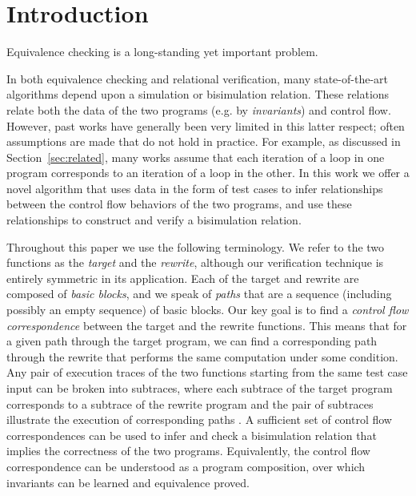 \section{Introduction}

Equivalence checking is a long-standing yet important problem.

In both equivalence checking and relational verification, many
state-of-the-art algorithms depend upon a simulation or bisimulation
relation. These relations relate both the data of the two programs
(e.g. by \emph{invariants}) and control flow. However, past works have
generally been very limited in this latter respect; often assumptions
are made that do not hold in practice. For example, as discussed in
Section~\ref{sec:related}, many works assume that each iteration of
a loop in one program corresponds to an iteration of a loop in the
other. In this work we offer a novel algorithm that uses data in
the form of test cases to infer relationships between the control
flow behaviors of the two programs, and use these relationships to
construct and verify a bisimulation relation.

Throughout this paper we use the following terminology. We refer
to the two functions as the \emph{target} and the \emph{rewrite},
although our verification technique is entirely symmetric in
its application. Each of the target and rewrite are composed of
\emph{basic blocks}, and we speak of \emph{paths} that are a sequence
(including possibly an empty sequence) of basic blocks. Our key goal
is to find a \emph{control flow correspondence} between the target and
the rewrite functions. This means that for a given path through the
target program, we can find a corresponding path through the rewrite
that performs the same computation under some condition. Any pair of
execution traces of the two functions starting from the same test
case input can be broken into subtraces, where each subtrace of the
target program corresponds to a subtrace of the rewrite program and
the pair of subtraces illustrate the execution of corresponding paths
. A sufficient set of control flow
correspondences can be used to infer and check a bisimulation relation
that implies the correctness of the two programs. Equivalently,
the control flow correspondence can be understood as a program
composition, over which invariants can be learned and equivalence
proved.

